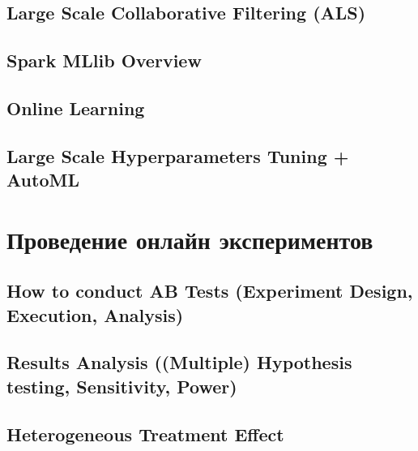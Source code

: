 \documentclass[12pt]{book}
\numberwithin{equation}{section}
\begin{document}
\chapter{Large Scale Collaborative Filtering (ALS)}

\chapter{Spark MLlib Overview}

\chapter{Online Learning}

\chapter{Large Scale Hyperparameters Tuning + AutoML}

\part{Проведение онлайн экспериментов}
\chapter{How to conduct AB Tests (Experiment Design, Execution, Analysis)}

\chapter{Results Analysis ((Multiple) Hypothesis testing, Sensitivity, Power)}

\chapter{Heterogeneous Treatment Effect}

\nocite{*}




\end{document}
